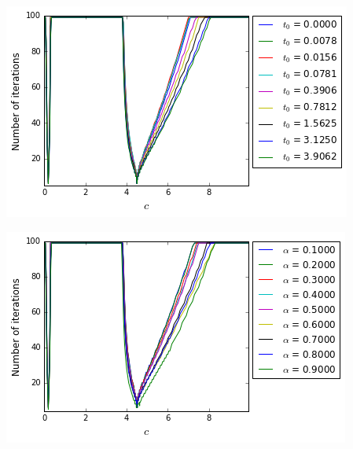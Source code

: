 \begingroup
\addtocounter{figure}{1}
\noindent
\begin{minipage}[t]{.5\linewidth}
\begin{center}
	\includegraphics[scale=.4]{figures/FinalFigures/NiterxCoefVarT0FinalVersionP.png}
\end{center}
\end{minipage}
\begin{minipage}[t]{.5\linewidth}
\begin{center}
	\includegraphics[scale=.4]{figures/FinalFigures/NiterxCoefVarinterfaceFinalVersionP.png}
\end{center}
\end{minipage}
